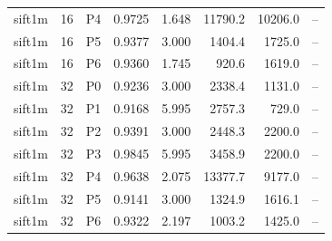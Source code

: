 \begin{tabular}{llrrrrrr}
sift1m & 16 & P4 & 0.9725 & 1.648 & 11790.2 & 10206.0 & -- \\
sift1m & 16 & P5 & 0.9377 & 3.000 & 1404.4 & 1725.0 & -- \\
sift1m & 16 & P6 & 0.9360 & 1.745 & 920.6 & 1619.0 & -- \\
sift1m & 32 & P0 & 0.9236 & 3.000 & 2338.4 & 1131.0 & -- \\
sift1m & 32 & P1 & 0.9168 & 5.995 & 2757.3 & 729.0 & -- \\
sift1m & 32 & P2 & 0.9391 & 3.000 & 2448.3 & 2200.0 & -- \\
sift1m & 32 & P3 & 0.9845 & 5.995 & 3458.9 & 2200.0 & -- \\
sift1m & 32 & P4 & 0.9638 & 2.075 & 13377.7 & 9177.0 & -- \\
sift1m & 32 & P5 & 0.9141 & 3.000 & 1324.9 & 1616.1 & -- \\
sift1m & 32 & P6 & 0.9322 & 2.197 & 1003.2 & 1425.0 & -- \\
\bottomrule
\end{tabular}
